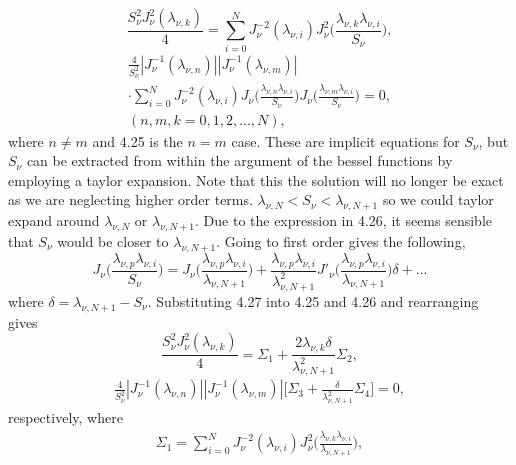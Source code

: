 \documentclass[10pt]{article}
\numberwithin{equation}{section}
\begin{document}
\begin{multicols}{2}
\begin{equation}
\frac{S^{2}_{\nu}J^{2}_{\nu}(\lambda_{\nu,k})}{4} = \sum_{i=0}^{N}J^{-2}_{\nu}(\lambda_{\nu,i})J^{2}_{\nu}\bigg(\frac{\lambda_{\nu,k}\lambda_{\nu,i}}{S_{\nu}}\bigg),
\end{equation}
\begin{multline}
\frac{4}{S^{2}_{\nu}}|J^{-1}_{\nu}(\lambda_{\nu,n})||J^{-1}_{\nu}(\lambda_{\nu,m})|\\ \cdot\sum_{i=0}^{N}J^{-2}_{\nu}(\lambda_{\nu,i})J_{\nu}\bigg(\frac{\lambda_{\nu,n}\lambda_{\nu,i}}{S_{\nu}}\bigg)J_{\nu}\bigg(\frac{\lambda_{\nu,m}\lambda_{\nu,i}}{S_{\nu}}\bigg)=0, \\ (n,m,k = 0,1,2,...,N),
\end{multline}
where $n\neq m$ and 4.25 is the $n=m$ case. These are implicit equations for $S_{\nu}$, but $S_{\nu}$ can be extracted from within the argument of the bessel functions by employing a taylor expansion. Note that this the solution will no longer be exact as we are neglecting higher order terms. $\lambda_{\nu,N}<S_{\nu}<\lambda_{\nu,N+1}$ so we could taylor expand around $\lambda_{\nu,N}$ or $\lambda_{\nu,N+1}$. Due to the  expression in 4.26, it seems sensible that $S_{\nu}$ would be closer to  $\lambda_{\nu,N+1}$. Going to first order gives the following,
\begin{equation}
J_{\nu}\bigg(\frac{\lambda_{\nu,p}\lambda_{\nu,i}}{S_{\nu}}\bigg) = J_{\nu}\bigg(\frac{\lambda_{\nu,p}\lambda_{\nu,i}}{\lambda_{\nu,N+1}}\bigg) + \frac{\lambda_{\nu,p}\lambda_{\nu,i}}{\lambda^{2}_{\nu,N+1}} J'_{\nu}\bigg(\frac{\lambda_{\nu,p}\lambda_{\nu,i}}{\lambda_{\nu,N+1}}\bigg) \delta +...
\end{equation}
where $\delta=\lambda_{\nu,N+1}-S_{\nu}$. Substituting 4.27 into 4.25 and 4.26 and rearranging gives
\begin{equation}
\frac{S^{2}_{\nu}J^{2}_{\nu}(\lambda_{\nu,k})}{4} =  \Sigma_{1} + \frac{2\lambda_{\nu,k}\delta}{\lambda^{2}_{\nu,N+1}}\Sigma_{2},
\end{equation}
\begin{multline}
\frac{4}{S^{2}_{\nu}}|J^{-1}_{\nu}(\lambda_{\nu,n})||J^{-1}_{\nu}(\lambda_{\nu,m})|\bigg[\Sigma_{3}+\frac{\delta}{\lambda^{2}_{\nu,N+1}}\Sigma_{4}\bigg]=0,
\end{multline}
respectively, where
\begin{multline}
\Sigma_{1} = \sum_{i=0}^{N}J^{-2}_{\nu}(\lambda_{\nu,i})J^{2}_{\nu}\bigg(\frac{\lambda_{\nu,k}\lambda_{\nu,i}}{\lambda_{\nu,N+1}}\bigg),\\

\end{multline}
\end{multicols}
\end{document}
